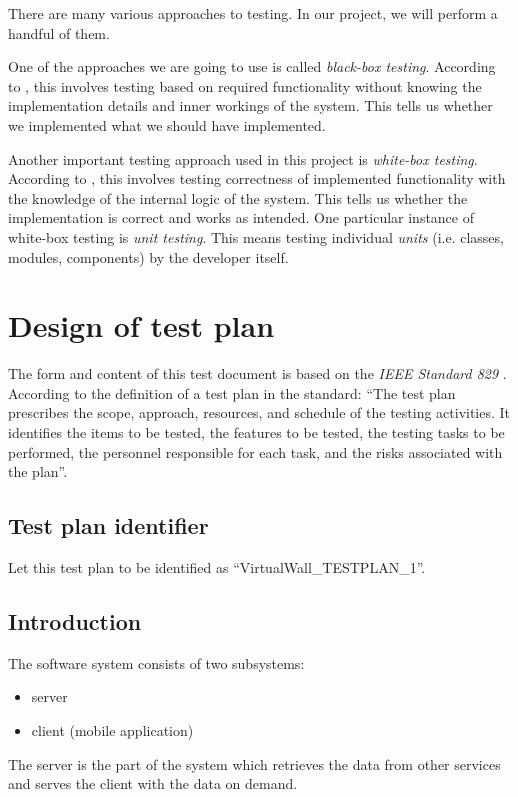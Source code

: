 \documentclass[11pt]{book}
\begin{document}
There are many various approaches to testing. In our project, we will perform a handful of them.

One of the approaches we are going to use is called \emph{black-box testing}. According to \cite{shinde}, this involves testing based on required functionality without knowing the implementation details and inner workings of the system. This tells us whether we implemented what we should have implemented.

Another important testing approach used in this project is \emph{white-box testing}. According to \cite{shinde}, this involves testing correctness of implemented functionality with the knowledge of the internal logic of the system. This tells us whether the implementation is correct and works as intended. One particular instance of white-box testing is \emph{unit testing}. This means testing individual \emph{units} (i.e. classes, modules, components) by the developer itself.

\section{Design of test plan}

The form and content of this test document is based on the \emph{IEEE Standard 829} \cite{ieee829}. According to the definition of a test plan in the standard: ``The test plan prescribes the scope, approach, resources, and schedule of the testing activities. It identifies the items to be tested, the features to be tested, the testing tasks to be performed, the personnel responsible for each task, and the risks associated with the plan''.

\subsection{Test plan identifier}
Let this test plan to be identified as ``VirtualWall\_TESTPLAN\_1''.

\subsection{Introduction}
The \systemname software system consists of two subsystems:

\begin{itemize}
    \item server
    \item client (mobile application)
\end{itemize}

The server is the part of the system which retrieves the data from other services and serves the client with the data on demand.
\end{document}
